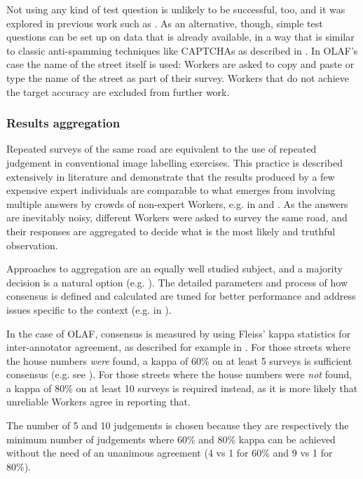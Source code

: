 Not using any kind of test question is unlikely to be successful, too, and it was explored in previous work such as \cite{DellaPenna:tf}. As an alternative, though, simple test questions can be set up on data that is already available, in a way that is similar to classic anti-spamming techniques like CAPTCHAs as described in \cite{Difallah:2012ty}. In OLAF's case the name of the street itself is used: Workers are asked to copy and paste or type the name of the street as part of their survey. Workers that do not achieve the target accuracy are excluded from further work.

\subsubsection{Results aggregation}

Repeated surveys of the same road are equivalent to the use of repeated judgement in conventional image labelling exercises. This practice is described extensively in literature and demonstrate that the results produced by a few expensive expert individuals are comparable to what emerges from involving multiple answers by crowds of non-expert Workers, e.g. in \cite{Snow:2008wo} and \cite{Sheng:2008gra}. As the answers are inevitably noisy, different Workers were asked to survey the same road, and their responses are aggregated to decide what is the most likely and truthful observation. 
        
Approaches to aggregation are an equally well studied subject, and a majority decision is a natural option (e.g. \cite{Le:2010ug}). The detailed parameters and process of how consensus is defined and calculated are tuned for better performance and address issues specific to the context (e.g. in \cite{Hirth:2011fh}). 

In the case of OLAF, consensus is measured by using Fleiss' kappa statistics for inter-annotator agreement, as described for example in \cite{Nowak:2010gt}. For those streets where the house numbers {\it were} found, a kappa of 60\% on at least 5 surveys is sufficient consensus (e.g. see \cite{Landis:1977kv}). For those streets where the house numbers were {\it not} found, a kappa of 80\% on at least 10 surveys is required instead, as it is more likely that unreliable Workers agree in reporting that.

The number of 5 and 10 judgements is chosen because they are respectively the minimum number of judgements where 60\% and 80\% kappa can be achieved without the need of an unanimous agreement (4 vs 1 for 60\% and 9 vs 1 for 80\%). 

